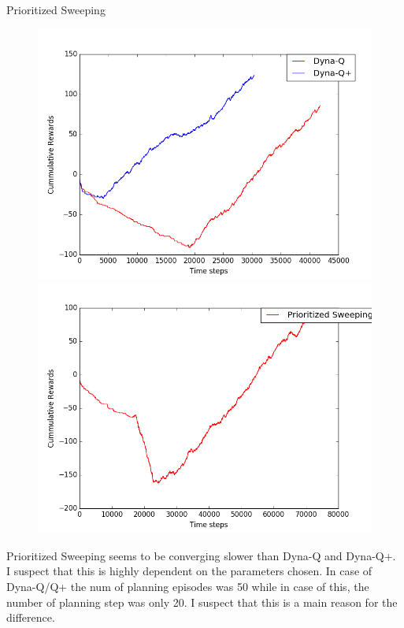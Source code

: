 \documentclass[12pt]{article}
\newenvironment{problem}[2][\large Problem]{\begin{trivlist}
\item[\hskip \labelsep {\bfseries #1}\hskip \labelsep {\bfseries #2.}]}{\end{trivlist}}
\begin{document}
\begin{problem} {3} Prioritized Sweeping\\
\begin{figure}[h]
	\centering
	\includegraphics[width = 0.45\linewidth]{DQ_DQ_plus.png}
	\includegraphics[width = 0.45\linewidth]{PS.png}
\end{figure}	
Prioritized Sweeping seems to be converging slower than Dyna-Q and Dyna-Q+. I suspect that this is highly dependent on the parameters chosen. In case of Dyna-Q/Q+ the num of planning episodes was 50 while in case of this, the number of planning step was only 20. I suspect that this is a main reason for the difference. 
\newpage


\end{problem}
\end{document}
